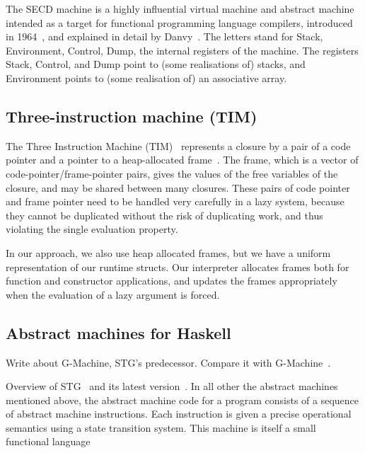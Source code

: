\documentclass[diploma]{softlab-thesis}
\begin{document}
The SECD machine is a highly influential virtual machine and abstract 
machine intended as a target for functional programming 
language compilers, introduced in 1964~\cite{La64}, and explained
in detail by Danvy~\cite{Danvy:2004:RDL:2154439.2154443}. The letters stand for Stack, Environment, 
Control, Dump, the internal registers of the machine. 
The registers Stack, Control, and Dump point to (some 
realisations of) stacks, and Environment points to (some 
realisation of) an associative array.

\subsection{Three-instruction machine (TIM)}
\label{sec:tim}

The Three Instruction Machine (TIM)~\cite{Argo89} represents a closure by a pair of a code pointer and
a pointer to a heap-allocated frame~\cite{Fairbairn87}. The frame, which is a vector
of code-pointer/frame-pointer pairs, gives the values of the free variables of the closure, and
may be shared between many closures. These pairs of code pointer and frame pointer need to be
handled very carefully in a lazy system, because they cannot be duplicated without the risk of
duplicating work, and thus violating the single evaluation property.

In our approach, we also use heap allocated frames, but we have a uniform representation 
of our runtime structs. Our interpreter allocates frames both for function and constructor 
applications, and updates the frames appropriately when the evaluation of a lazy argument is 
forced.


\subsection{Abstract machines for Haskell}
\label{sec:stg}
Write about G-Machine, STG's predecessor. Compare it with G-Machine~\cite{Jo90}.

Overview of STG~\cite{Jo92} and its latest version~\cite{Ma06}.
In all other the abstract machines mentioned above, the abstract machine code for a
program consists of a sequence of abstract machine instructions. Each instruction is
given a precise operational semantics using a state transition system.
This machine is itself a small functional language 
\end{document}
